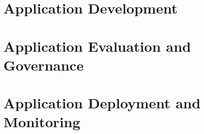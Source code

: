 \documentclass[11pt]{scrartcl}
\begin{document}
\newpage
\section{Application Development}


\newpage
\section{Application Evaluation and Governance}


\newpage
\section{Application Deployment and Monitoring}
\end{document}
